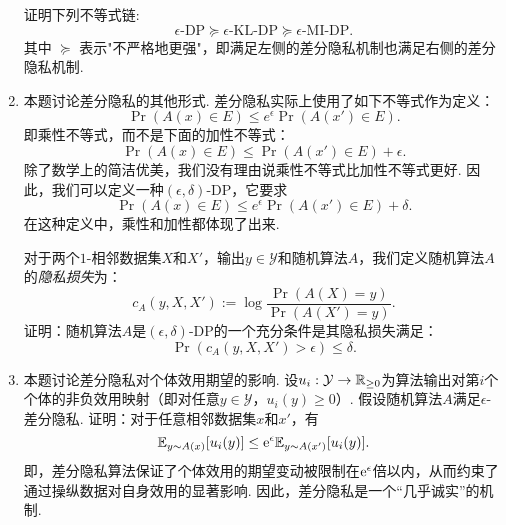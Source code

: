 \begin{enumerate}[wide, labelindent=0pt]
    证明下列不等式链:
    \[
        \epsilon\text{-DP} \succeq \epsilon\text{-KL-DP} \succeq \epsilon\text{-MI-DP}.
    \]
    其中 $\succeq$ 表示"不严格地更强"，即满足左侧的差分隐私机制也满足右侧的差分隐私机制.

    \item 本题讨论差分隐私的其他形式. 差分隐私实际上使用了如下不等式作为定义：
    \[\Pr(A(x)\in E) \leq e^{\epsilon} \Pr(A(x') \in E).\]
    即乘性不等式，而不是下面的加性不等式：
    \[\Pr(A(x)\in E) \leq \Pr(A(x') \in E) + \epsilon.\]
    除了数学上的简洁优美，我们没有理由说乘性不等式比加性不等式更好. 因此，我们可以定义一种$(\epsilon, \delta)$-DP，它要求
    \[
    \Pr(A(x)\in E) \leq e^{\epsilon} \Pr(A(x') \in E) + \delta.
    \]
    在这种定义中，乘性和加性都体现了出来. 
    
    对于两个$1$-相邻数据集$X$和$X'$，输出$y \in \mathcal Y$和随机算法$A$，我们定义随机算法$A$的\emph{隐私损失}为：
    \[
        c_A(y,  X, X') := \log \frac{\Pr(A( X) = y)}{\Pr(A( X') = y)}.
    \]
    证明：随机算法$A$是$(\epsilon, \delta)$-DP的一个充分条件是其隐私损失满足：
    \[
        \Pr(c_A(y,  X,  X') > \epsilon) \leq \delta.
    \]

    \item 本题讨论差分隐私对个体效用期望的影响. 设$u_i: \mathcal{Y} \to \mathbb{R}_{\geq 0}$为算法输出对第$i$个个体的非负效用映射（即对任意$y \in \mathcal{Y}$，$u_i(y) \geq 0$）. 假设随机算法$A$满足$\epsilon$-差分隐私. 证明：对于任意相邻数据集$x$和$x'$，有  
    \[
    \mathbb{E}_{y \sim A(x)}[u_i(y)] \leq \mathrm{e}^{\epsilon} \mathbb{E}_{y \sim A(x')}[u_i(y)].
    \]  
    即，差分隐私算法保证了个体效用的期望变动被限制在$\mathrm{e}^{\epsilon}$倍以内，从而约束了通过操纵数据对自身效用的显著影响. 因此，差分隐私是一个“几乎诚实”的机制. 

\end{enumerate}

